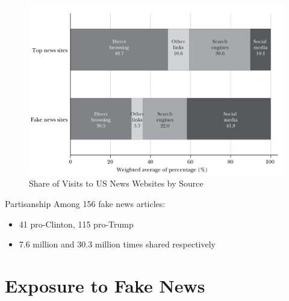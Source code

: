 \documentclass[
  10pt,
  ignorenonframetext,
  aspectratio=43,
]{beamer}
\providecommand{\tightlist}{%
  \setlength{\itemsep}{0pt}\setlength{\parskip}{0pt}}
\begin{document}
\begin{frame}
\begin{figure}
\centering
\includegraphics{20220315-allcott-gentzkow-2016-election-fake-news.assets/image-20220314203702283.png}
\caption{Share of Visits to US News Websites by Source}
\end{figure}
\end{frame}

\begin{frame}
\begin{block}{Partisanship}
\protect\hypertarget{partisanship}{}
Among 156 fake news articles:

\begin{itemize}
\tightlist
\item
  41 pro-Clinton, 115 pro-Trump
\item
  7.6 million and 30.3 million times shared respectively
\end{itemize}
\end{block}
\end{frame}

\hypertarget{exposure-to-fake-news}{%
\section{Exposure to Fake News}\label{exposure-to-fake-news}}
\end{document}
